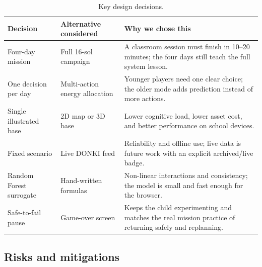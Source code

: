 \documentclass[11pt,a4paper]{article}
\begin{document}
\begin{table}[H]
\centering
\small
\begin{tabular}{@{}p{4.0cm}p{4.2cm}p{6.2cm}@{}}
\toprule
\textbf{Decision} & \textbf{Alternative considered} & \textbf{Why we chose this}\\
\midrule
Four-day mission & Full 16-sol campaign & A classroom session must finish in 10--20 minutes; the four days still teach the full system lesson.\\
One decision per day & Multi-action energy allocation & Younger players need one clear choice; the older mode adds prediction instead of more actions.\\
Single illustrated base & 2D map or 3D base & Lower cognitive load, lower asset cost, and better performance on school devices.\\
Fixed scenario & Live DONKI feed & Reliability and offline use; live data is future work with an explicit archived/live badge.\\
Random Forest surrogate & Hand-written formulas & Non-linear interactions and consistency; the model is small and fast enough for the browser.\\
Safe-to-fail pause & Game-over screen & Keeps the child experimenting and matches the real mission practice of returning safely and replanning.\\
\bottomrule
\end{tabular}
\caption{Key design decisions.}
\label{tab:decisions}
\end{table}

\subsection{Risks and mitigations}
\end{document}
